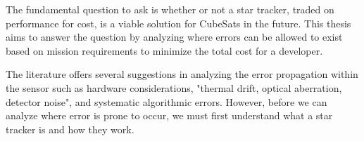 \par \qquad The fundamental question to ask is whether or not a star tracker, traded on performance for cost, is a viable solution for CubeSats in the future.
This thesis aims to answer the question by analyzing where errors can be allowed to exist based on mission requirements to minimize the total cost for a developer.

\par \qquad The literature offers several suggestions in analyzing the error propagation within the sensor such as hardware considerations, "thermal drift, optical aberration, detector noise"\cite{systematic_error_analysis_of_star_tracker_centroiding}, and systematic algorithmic errors.
However, before we can analyze where error is prone to occur, we must first understand what a star tracker is and how they work.
